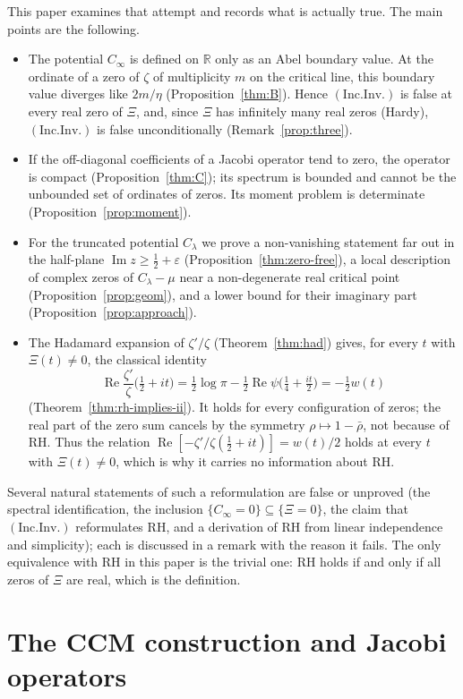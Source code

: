 \documentclass[11pt]{amsart}
\theoremstyle{definition}
\theoremstyle{remark}
\newcommand{\RH}{\mathrm{RH}}
\renewcommand{\Re}{\operatorname{Re}}
\renewcommand{\Im}{\operatorname{Im}}
\newcommand{\half}{\tfrac12}
\newcommand{\Cinf}{C_\infty}
\newcommand{\Clam}{C_\lambda}
\newcommand{\incInv}{(\mathrm{Inc.Inv.})}
\begin{document}
This paper examines that attempt and records what is actually true. The main points are the
following.
\begin{itemize}
\item The potential $\Cinf$ is defined on $\mathbb R$ only as an Abel boundary value. At the
ordinate of a zero of $\zeta$ of multiplicity $m$ on the critical line, this boundary value
diverges like $2m/\eta$ (Proposition~\ref{thm:B}). Hence $\incInv$ is false at every real zero of
$\Xi$, and, since $\Xi$ has infinitely many real zeros (Hardy), $\incInv$ is false
unconditionally (Remark~\ref{prop:three}).
\item If the off-diagonal coefficients of a Jacobi operator tend to zero, the operator is
compact (Proposition~\ref{thm:C}); its spectrum is bounded and cannot be the unbounded set of
ordinates of zeros. Its moment problem is determinate (Proposition~\ref{prop:moment}).
\item For the truncated potential $\Clam$ we prove a non-vanishing statement far out in the
half-plane $\Im z\ge\half+\varepsilon$ (Proposition~\ref{thm:zero-free}), a local description of
complex zeros of $\Clam-\mu$ near a non-degenerate real critical point
(Proposition~\ref{prop:geom}), and a lower bound for their imaginary part
(Proposition~\ref{prop:approach}).
\item The Hadamard expansion of $\zeta'/\zeta$ (Theorem~\ref{thm:had})
gives, for every $t$ with $\Xi(t)\ne0$, the classical identity
\[
\Re\frac{\zeta'}{\zeta}\big(\tfrac12+it\big)=\tfrac12\log\pi-\tfrac12\Re\psi\big(\tfrac14+
\tfrac{it}2\big)=-\tfrac12w(t)
\]
(Theorem~\ref{thm:rh-implies-ii}). It holds for every configuration of zeros; the real part of
the zero sum cancels by the symmetry $\rho\mapsto1-\bar\rho$, not because of $\RH$. Thus the
relation $\Re[-\zeta'/\zeta(\half+it)]=w(t)/2$ holds at every $t$ with $\Xi(t)\ne0$, which is
why it carries no information about $\RH$.
\end{itemize}
Several natural statements of such a reformulation are false or unproved (the spectral
identification, the inclusion $\{\Cinf=0\}\subseteq\{\Xi=0\}$, the claim that $\incInv$ reformulates $\RH$, and a derivation of $\RH$ from linear independence and simplicity); each is
discussed in a remark with the reason it fails. The only equivalence with $\RH$ in this paper is the trivial
one: $\RH$ holds if and only if all zeros of $\Xi$ are real, which is the definition.

\section{The CCM construction and Jacobi operators}\label{sec:ccm}
\end{document}
